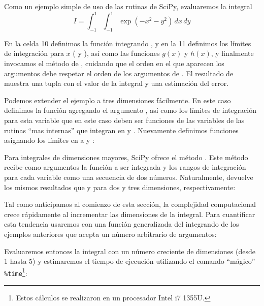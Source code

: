 Como un ejemplo simple de uso de las rutinas de SciPy, evaluaremos la integral
\begin{equation}\label{eq:intmcmul02}
 I = \int_{-1}^{1} \int_{-1}^1 \exp\left( -x^2 - y^2 \right) \, dx \, dy 
\end{equation}

En la celda 10 definimos la función integrando , y en la 11 definimos los límites de integración para $x$ ( y ), así como las funciones $g(x)$ y $h(x)$, y finalmente invocamos el método  de , cuidando que el orden en el que aparecen los argumentos debe respetar el orden de los argumentos de . El resultado de  muestra una tupla con el valor de la integral y una estimación del error.

Podemos extender el ejemplo a tres dimensiones fácilmente. En este caso definimos la función  agregando el argumento , así como los límites de integración para esta variable que en este caso deben ser funciones de las variables de las rutinas ``mas internas'' que integran en  y . Nuevamente definimos funciones asignando los límites en  a  y :

Para integrales de dimensiones mayores, SciPy ofrece el método . Este método recibe como argumentos la función a ser integrada y los rangos de integración para cada variable como una secuencia de dos números. Naturalmente,  devuelve los mismos resultados que  y  para dos y tres dimensiones, respectivamente:

Tal como anticipamos al comienzo de esta sección, la complejidad computacional crece rápidamente al incrementar las dimensiones de la integral. Para cuantificar esta tendencia usaremos  con una función generalizada del integrando de los ejemplos anteriores que acepta un número arbitrario de argumentos:

Evaluaremos entonces la integral con un número creciente de dimensiones (desde 1 hasta 5) y estimaremos el tiempo de ejecución utilizando el comando ``mágico'' \verb|%time|\footnote{Estos cálculos se realizaron en un procesador Intel i7 1355U.}:

